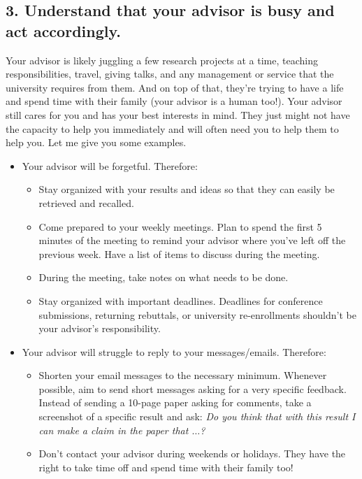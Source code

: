 \documentclass[10pt,twocolumn]{article}
\begin{document}
\subsection*{3. Understand that your advisor is busy and act accordingly.}

Your advisor is likely juggling a few research projects at a time, teaching responsibilities, travel, giving talks, and any management or service that the university requires from them. And on top of that, they’re trying to have a life and spend time with their family (your advisor is a human too!). Your advisor still cares for you and has your best interests in mind. They just might not have the capacity to help you immediately and will often need you to help them to help you. Let me give you some examples.

\begin{itemize}

\item Your advisor will be forgetful. Therefore:

\begin{itemize}
\item Stay organized with your results and ideas so that they can easily be retrieved and recalled.
\item Come prepared to your weekly meetings. Plan to spend the first 5 minutes of the meeting to remind your advisor where you’ve left off the previous week. Have a list of items to discuss during the meeting. \item During the meeting, take notes on what needs to be done.
\item Stay organized with important deadlines. Deadlines for conference submissions, returning rebuttals, or university re-enrollments shouldn’t be your advisor’s responsibility.
\end{itemize}

\item Your advisor will struggle to reply to your messages/emails. Therefore:

\begin{itemize}
\item Shorten your email messages to the necessary minimum. Whenever possible, aim to send short messages asking for a very specific feedback. Instead of sending a 10-page paper asking for comments, take a screenshot of a specific result and ask: \textit{Do you think that with this result I can make a claim in the paper that $\dots$?}
\item Don’t contact your advisor during weekends or holidays. They have the right to take time off and spend time with their family too!
\end{itemize}


\end{itemize}
\end{document}
